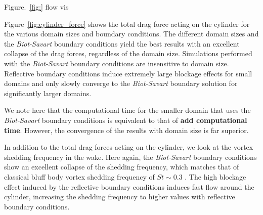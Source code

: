 \documentclass{article}
\begin{document}
Figure.~\ref{fig:} flow vis

Figure~\ref{fig:cylinder_force} shows the total drag force acting on the cylinder for the various domain sizes and boundary conditions. The different domain sizes and the \emph{Biot-Savart} boundary conditions yield the best results with an excellent collapse of the drag forces, regardless of the domain size. Simulations performed with the \emph{Biot-Savart} boundary conditions are insensitive to domain size. Reflective boundary conditions induce extremely large blockage effects for small domains and only slowly converge to the \emph{Biot-Savart} boundary solution for significantly larger domains.

We note here that the computational time for the smaller domain that uses the \emph{Biot-Savart} boundary conditions is equivalent to that of \textbf{add computational time}. However, the convergence of the results with domain size is far superior.

In addition to the total drag forces acting on the cylinder, we look at the vortex shedding frequency in the wake. Here again, the \emph{Biot-Savart} boundary conditions show an excellent collapse of the shedding frequency, which matches that of classical bluff body vortex shedding frequency of $St\sim 0.3$ \cite{}. The high blockage effect induced by the reflective boundary conditions induces fast flow around the cylinder, increasing the shedding frequency to higher values with reflective boundary conditions.
\end{document}
